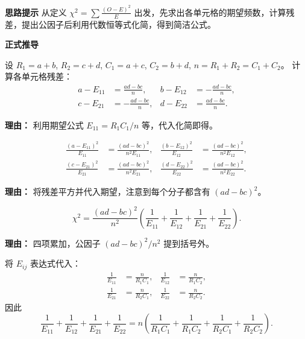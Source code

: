 \begin{proofbox}
	\textbf{\textcolor{CProof}{思路提示}}
	从定义 $\chi^2 = \sum\frac{(O-E)^2}{E}$ 出发，先求出各单元格的期望频数，计算残差，提出公因子后利用代数恒等式化简，得到简洁公式。

	\medskip
	\textbf{\textcolor{CProof}{正式推导}}
	\begin{description}[style=nextline, leftmargin=2.8em, labelsep=0.5em, itemsep=0.55em]
		\item[\textbf{步骤一（建立符号与残差）：}]
			设 $R_1=a+b$, $R_2=c+d$, $C_1=a+c$, $C_2=b+d$, $n=R_1+R_2=C_1+C_2$。 计算各单元格残差：
			\[
				\begin{aligned}
					a-E_{11} &= \frac{ad-bc}{n}, & b-E_{12} &= -\frac{ad-bc}{n},\\ c-E_{21} &= -\frac{ad-bc}{n}, & d-E_{22} &= \frac{ad-bc}{n}.
			\end{aligned}
			\]
			\par\textbf{理由：} 利用期望公式 $E_{11}=R_1C_1/n$ 等，代入化简即得。
		\item[\textbf{步骤二（写出每项平方与期望比值）：}]
			\[
				\begin{aligned}
					\frac{(a-E_{11})^2}{E_{11}} &= \frac{(ad-bc)^2}{n^2 E_{11}}, & \frac{(b-E_{12})^2}{E_{12}} &= \frac{(ad-bc)^2}{n^2 E_{12}},\\ \frac{(c-E_{21})^2}{E_{21}} &= \frac{(ad-bc)^2}{n^2 E_{21}}, & \frac{(d-E_{22})^2}{E_{22}} &= \frac{(ad-bc)^2}{n^2 E_{22}}.
			\end{aligned}
			\]
			\par\textbf{理由：} 将残差平方并代入期望，注意到每个分子都含有 $(ad-bc)^2$。
		\item[\textbf{步骤三（提取公因子）：}]
			\[
				\chi^2 = \frac{(ad-bc)^2}{n^2}\left(\frac{1}{E_{11}}+\frac{1}{E_{12}}+\frac{1}{E_{21}}+\frac{1}{E_{22}}\right).
			\]
			\par\textbf{理由：} 四项累加，公因子 $(ad-bc)^2/n^2$ 提到括号外。
		\item[\textbf{步骤四（计算期望倒数之和）：}]
			将 $E_{ij}$ 表达式代入：
			\[
				\begin{aligned}
					\frac{1}{E_{11}} &= \frac{n}{R_1C_1}, & \frac{1}{E_{12}} &= \frac{n}{R_1C_2},\\ \frac{1}{E_{21}} &= \frac{n}{R_2C_1}, & \frac{1}{E_{22}} &= \frac{n}{R_2C_2}.
			\end{aligned}
			\]
			因此
			\[
				\frac{1}{E_{11}}+\frac{1}{E_{12}}+\frac{1}{E_{21}}+\frac{1}{E_{22}} = n\left(\frac{1}{R_1C_1}+\frac{1}{R_1C_2}+\frac{1}{R_2C_1}+\frac{1}{R_2C_2}\right).
\]
\end{description}
\end{proofbox}
